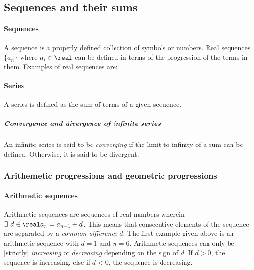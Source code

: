 \subsection{Sequences and their sums}

\paragraph{Sequences}
A sequence is a properly defined collection of symbols or numbers.
Real sequences $\{a_n\}$ where $a_i \in \real$ can be defined in terms of the progression of the terms in them.
Examples of real sequences are:
\begin{enumerate}
  \item $\{ a_n\} = \{ 23, 24, 25, 26, 27, 28\}; n = 6$
  \item $\{ g_n\} = \{ -2, 4, -8, 16, -32, 64\}; n = 6$
  \item $\{ t_n\} = \{ 1, 1, 2, 3, 5, 8, 13, 21, 34}; n = 9$
  \item $\{ f_n\} = \{ 1, 3, 6, 10, 15, 21, 28\}; n = 7$
\end{enumerate}

\paragraph{Series}
A series is defined as the sum of terms of a given sequence.

\subparagraph{Convergence and divergence of infinite series}
An infinite series is said to be \emph{converging} if the limit to infinity of a sum can be defined.
Otherwise, it is said to be divergent.

\subsubsection{Arithemetic progressions and geometric progressions}

\paragraph{Arithmetic sequences} 
Arithmetic sequences are sequences of real numbers wherein $\exists\ d \in \real a_n = a_{n-1} + d$.
This means that consecutive elements of the sequence are separated by a \emph{common difference} $d$.
The first example given above is an arithmetic sequence with $d = 1$ and $n = 6$.
Arithmetic sequences can only be [strictly] \emph{increasing} or \emph{decreasing} depending on the sign of $d$.
If $d > 0$, the sequence is increasing, else if $d < 0$, the sequence is decreasing.


